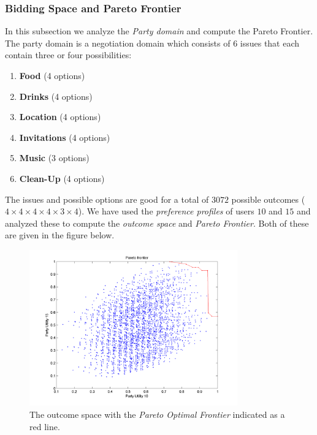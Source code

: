 \documentclass[a4paper,10pt]{article}
\begin{document}
\subsubsection{Bidding Space and Pareto Frontier}

In this subsection we analyze the \emph{Party domain} and compute the Pareto Frontier. The party domain is a negotiation domain which consists of $6$ issues that each contain three or four possibilities: 

\begin{enumerate}[itemsep=0mm]
  \item \textbf{Food} (4 options)
  \item \textbf{Drinks} (4 options)
  \item \textbf{Location} (4 options)
  \item \textbf{Invitations} (4 options)
  \item \textbf{Music} (3 options)
  \item \textbf{Clean-Up} (4 options)
\end{enumerate}

The issues and possible options are good for a total of $3072$ possible outcomes ($4 \times 4 \times 4 \times 4 \times 3 \times 4$). We have used the \emph{preference profiles} of users $10$ and $15$ and analyzed these to compute the \emph{outcome space} and \emph{Pareto Frontier}. Both of these are given in the figure below.

\begin{figure}[H]
\begin{center}
 \includegraphics[width=0.8\textwidth]{pareto.png}
 \caption{The outcome space with the \emph{Pareto Optimal Frontier} indicated as a red line.}
 \label{fig:pareto} 
\end{center}
\end{figure}
\end{document}
